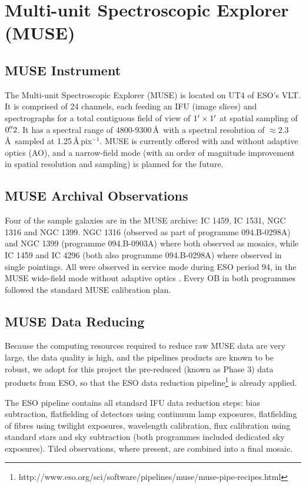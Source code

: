 		
\section{Multi-unit Spectroscopic Explorer (MUSE)}
	\label{sec:MUSE}

	\subsection{MUSE Instrument}
		The Multi-unit Spectroscopic Explorer (MUSE) is located on UT4 of ESO's VLT. It is comprised of 24 channels, each feeding an IFU (image slices) and spectrographs for a total contiguous field of view of $1\hbox{$^\prime$} \times 1\hbox{$^\prime$}$ at spatial sampling of $0\hbox{$.\!\!^{\prime\prime}$}2$. It has a spectral range of 4800-9300\,\AA\ with a spectral resolution of $\approx 2.3$\,\AA\ sampled at 1.25\,\AA\,pix$^{-1}$. MUSE is currently offered with and without adaptive optics (AO), and a narrow-field mode (with an order of magnitude improvement in spatial resolution and sampling) is planned for the future. 
		
	\subsection{MUSE Archival Observations}
		Four of the sample galaxies are in the MUSE archive: IC 1459, IC 1531, NGC 1316 and NGC 1399. NGC 1316 (observed as part of programme 094.B-0298A) and NGC 1399 (programme 094.B-0903A) where both observed as mosaics, while IC 1459 and IC 4296 (both also programme 094.B-0298A) where observed in single pointings. All were observed in service mode during ESO period 94, in the MUSE wide-field mode without adaptive optics . Every OB in both programmes followed the standard MUSE calibration plan.

	\subsection{MUSE Data Reducing}
		\label{subsec:MUSEreduction}
		
		Because the computing resources required to reduce raw MUSE data are very large, the data quality is high, and the pipelines products are known to be robust, we adopt for this project the pre-reduced (known as Phase 3) data products from ESO, so that the ESO data reduction pipeline\footnote{http://www.eso.org/sci/software/pipelines/muse/muse-pipe-recipes.html} is already applied. 

		The ESO pipeline contains all standard IFU data reduction steps: bias subtraction, flatfielding of detectors using continuum lamp exposures, flatfielding of fibres using twilight exposures, wavelength calibration, flux calibration using standard stars and sky subtraction (both programmes included dedicated sky exposures). Tiled observations, where present, are combined into a final mosaic.

